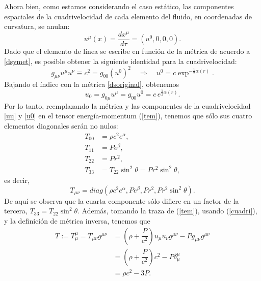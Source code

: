 Ahora bien, como estamos considerando el caso estático, las componentes espaciales de la cuadrivelocidad de cada elemento del fluido, en coordenadas de curvatura, se anulan:
\begin{equation}\label{uu}
 u^{\mu}(x)=\frac{dx^{\mu}}{d\tau}=(u^0,0,0,0).
\end{equation}
Dado que el elemento de línea se escribe en función de la métrica de acuerdo a \eqref{dsymet}, es posible obtener la siguiente identidad para la cuadrivelocidad:
\begin{equation}\label{cuadri}
g_{\mu\nu}u^{\mu}u^{\nu}\equiv c^2=g_{00}(u^0)^2\quad\Rightarrow\quad u^{0}=c\exp^{-\frac{1}{2}\alpha(r)}.
\end{equation}
Bajando el índice con la métrica \eqref{dsoriginal}, obtenemos
\begin{equation}\label{u0}
 u_0=g_{0\mu}u^{\mu}=g_{00}u^{0}=c\,e^{\frac{1}{2}\alpha(r)}.
\end{equation}
Por lo tanto, reemplazando la métrica y las componentes de la cuadrivelocidad  \eqref{uu} y \eqref{u0} en el tensor energía-momentum (\ref{tem}), tenemos que sólo sus cuatro elementos diagonales serán no nulos:
\begin{align}
T_{00}&=\rho c^2 e^{\alpha},\nonumber\\
T_{11}&=P e^{\beta},\nonumber\\
T_{22}&=P r^2,\label{tem2}\\
T_{33}&=T_{22}\sin^2\theta=P r^2\sin^2\theta,\nonumber
\end{align}
es decir,
\begin{equation}\label{tem3}
 \boxed{T_{\mu\nu}=diag(\rho c^2 e^{\alpha},P e^{\beta},P r^2,P r^2\sin^2\theta).}
\end{equation}
De aquí se observa que la cuarta componente sólo difiere en un factor de la tercera, $T_{33}=T_{22}\sin^2\theta$. Además, tomando la traza de (\ref{tem}), usando (\ref{cuadri}), y la definición de métrica inversa, tenemos que
\begin{align}\label{traza}
T:=T^{\mu}_{\mu}=T_{\mu\nu}g^{\mu\nu}&=\left(\rho+\dfrac{P}{c^2}\right)u_{\mu}u_{\nu}g^{\mu\nu}-Pg_{\mu\nu}g^{\mu\nu}\\
&=\left(\rho+\dfrac{P}{c^2}\right)c^2-P\delta_{\mu}^{\mu}\\
&=\rho c^2-3P.
\end{align}

